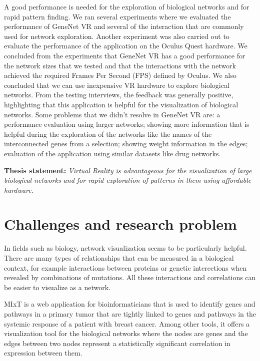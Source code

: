 A good performance is needed for the exploration of biological networks and for rapid pattern finding. We ran several experiments where we evaluated the performance of GeneNet VR and several of the interaction that are commonly used for network exploration. Another experiment was also carried out to evaluate the performance of the application on the Oculus Quest hardware. We concluded from the experiments that GeneNet VR has a good performance for the network sizes that we tested and that the interactions with the network achieved the required Frames Per Second (FPS) defined by Oculus. We also concluded that we can use inexpensive VR hardware to explore biological networks. From the testing interviews, the feedback was generally positive, highlighting that this application is helpful for the visualization of biological networks. Some problems that we didn't resolve in GeneNet VR are: a performance evaluation using larger networks; showing more information that is helpful during the exploration of the networks like the names of the interconnected genes from a selection; showing weight information in the edges; evaluation of the application using similar datasets like drug networks.

\textbf{Thesis statement: } \emph{Virtual Reality is advantageous for the visualization of large biological networks and for rapid exploration of patterns in them using affordable hardware}.

\section{Challenges and research problem}

In fields such as biology, network visualization seems to be particularly helpful\cite{pujana_network_modeling}\cite{fraser_view_function}. There are many types of relationships that can be measured in a biological context, for example interactions between proteins or genetic interections when revealed by combinations of mutations. All these interactions and correlations can be easier to visualize as a network\cite{merico_visualization}.

MIxT\cite{fjukstad_dumeaux_olsen_lund_hallett_bongo_2017} is a web application for bioinformaticians that is used to identify genes and pathways in a primary tumor that are tightly linked to genes and pathways in the systemic response of a patient with breast cancer\cite{dumeaux_fjukstad_interactions_tumor_blood}. Among other tools, it offers a visualization tool for the biological networks where the nodes are genes and the edges between two nodes represent a statistically significant correlation in expression between them.

